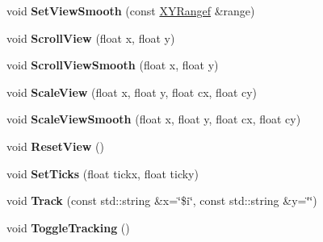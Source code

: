 \begin{DoxyCompactItemize}
\item 
void {\bfseries Set\+View\+Smooth} (const \hyperlink{structpangolin_1_1_x_y_range}{X\+Y\+Rangef} \&range)\hypertarget{classpangolin_1_1_plotter_a757162280c2fac9669e353a8ba8f4a3a}{}\label{classpangolin_1_1_plotter_a757162280c2fac9669e353a8ba8f4a3a}

\item 
void {\bfseries Scroll\+View} (float x, float y)\hypertarget{classpangolin_1_1_plotter_a0d49abf8d5222afa99cc23744dd38724}{}\label{classpangolin_1_1_plotter_a0d49abf8d5222afa99cc23744dd38724}

\item 
void {\bfseries Scroll\+View\+Smooth} (float x, float y)\hypertarget{classpangolin_1_1_plotter_a5b904e49878c93318ec71691b2ec90b1}{}\label{classpangolin_1_1_plotter_a5b904e49878c93318ec71691b2ec90b1}

\item 
void {\bfseries Scale\+View} (float x, float y, float cx, float cy)\hypertarget{classpangolin_1_1_plotter_a0d24221ae1f4d96231c2ddee484fb747}{}\label{classpangolin_1_1_plotter_a0d24221ae1f4d96231c2ddee484fb747}

\item 
void {\bfseries Scale\+View\+Smooth} (float x, float y, float cx, float cy)\hypertarget{classpangolin_1_1_plotter_a447409870dc48c516f8b4e4a8c9facc6}{}\label{classpangolin_1_1_plotter_a447409870dc48c516f8b4e4a8c9facc6}

\item 
void {\bfseries Reset\+View} ()\hypertarget{classpangolin_1_1_plotter_ad0cdb984126268ab5c38fb4b332df06c}{}\label{classpangolin_1_1_plotter_ad0cdb984126268ab5c38fb4b332df06c}

\item 
void {\bfseries Set\+Ticks} (float tickx, float ticky)\hypertarget{classpangolin_1_1_plotter_a4f2c2fe5f7aa764b1904e1d49e091332}{}\label{classpangolin_1_1_plotter_a4f2c2fe5f7aa764b1904e1d49e091332}

\item 
void {\bfseries Track} (const std\+::string \&x=\char`\"{}\$i\char`\"{}, const std\+::string \&y=\char`\"{}\char`\"{})\hypertarget{classpangolin_1_1_plotter_a545c30542785e231c337f4e55be04e17}{}\label{classpangolin_1_1_plotter_a545c30542785e231c337f4e55be04e17}

\item 
void {\bfseries Toggle\+Tracking} ()\hypertarget{classpangolin_1_1_plotter_ac78d898fcc8bbe9663dc6a4b20c6600d}{}\label{classpangolin_1_1_plotter_ac78d898fcc8bbe9663dc6a4b20c6600d}


\end{DoxyCompactItemize}
